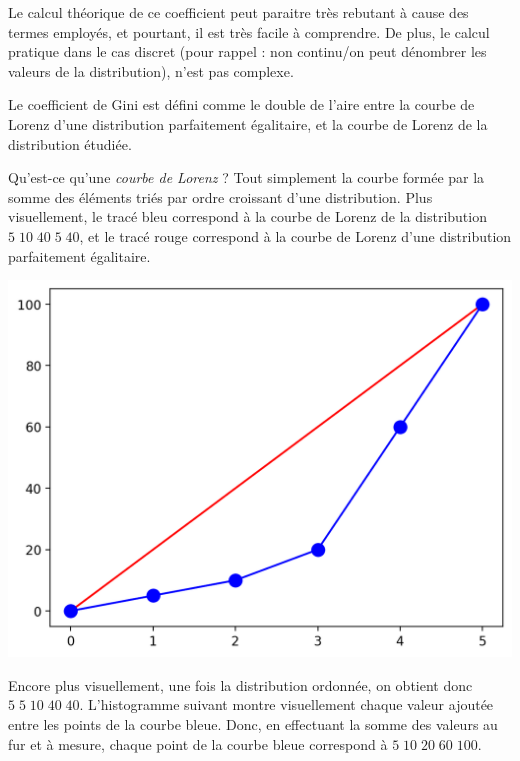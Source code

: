 \noindent Le calcul théorique de ce coefficient peut paraitre très rebutant à cause des termes employés, et pourtant, il est très facile à comprendre.
De plus, le calcul pratique dans le cas discret (pour rappel : non continu/on peut dénombrer les valeurs de la distribution), n'est pas complexe.

\bigskip

\noindent Le coefficient de Gini est défini comme le double de l'aire entre la courbe de Lorenz d'une distribution parfaitement égalitaire, et la courbe de Lorenz de la distribution étudiée.

\noindent Qu'est-ce qu'une \textit{courbe de Lorenz} ?
Tout simplement la courbe formée par la somme des éléments triés par ordre croissant d'une distribution.
Plus visuellement, le tracé bleu correspond à la courbe de Lorenz de la distribution $ 5 \; 10 \; 40 \; 5 \; 40 $, et le tracé rouge correspond à la courbe de Lorenz d'une distribution parfaitement égalitaire.

\bigskip

\begin{center}
\includegraphics[scale=0.60]{images/exemple_courbe_lorenz_simple.png}
\end{center}

\bigskip

\noindent Encore plus visuellement, une fois la distribution ordonnée, on obtient donc $ 5 \; 5 \; 10 \; 40 \; 40 $.
L'histogramme suivant montre visuellement chaque valeur ajoutée entre les points de la courbe bleue.
Donc, en effectuant la somme des valeurs au fur et à mesure, chaque point de la courbe bleue correspond à $ 5 \; 10 \; 20 \; 60 \; 100 $.

